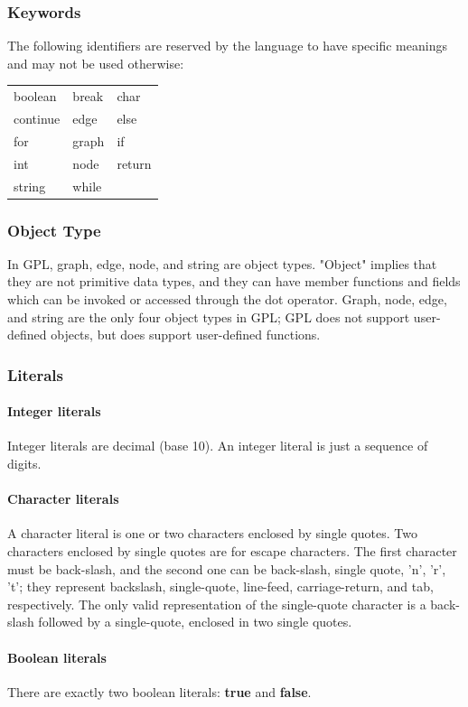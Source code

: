 \documentclass[a4paper,12pt]{article}
\begin{document}
\subsubsection{Keywords}
The following identifiers are reserved by the language to have specific meanings and may not be used otherwise:

\begin{tabular}{ l l l }
\hline
boolean & break & char \\
continue & edge & else \\
for & graph & if \\
int & node & return \\
string & while \\
\hline
\end{tabular}

\subsubsection{Object Type}
In GPL, graph, edge, node, and string are object types. "Object" implies that they are not primitive data types, and they can have member functions and fields which can be invoked or accessed through the dot operator. Graph, node, edge, and string are the only four object types in GPL; GPL does not support user-defined objects, but does support user-defined functions.

\subsubsection{Literals}\paragraph{Integer literals}
Integer literals are decimal (base 10). An integer literal is just a sequence of digits.
\paragraph{Character literals}
A character literal is one or two characters enclosed by single quotes. Two characters enclosed by single quotes are for escape characters. The first character must be back-slash, and the second one can be back-slash, single quote, 'n', 'r', 't'; they represent backslash, single-quote, line-feed, carriage-return, and tab, respectively. The only valid representation of the single-quote character is a back-slash followed by a single-quote, enclosed in two single quotes.

\paragraph{Boolean literals}
There are exactly two boolean literals: \textbf{true} and \textbf{false}.
\end{document}
